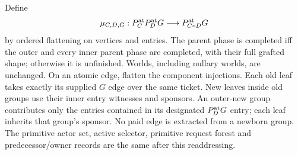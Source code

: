 \documentclass[11pt]{article}
\begin{document}
Define
\[
 \mu_{C,D,G}:P_C^{\rm at}P_D^{\rm at}G
             \longrightarrow P_{C\circ D}^{\rm at}G
\]
by ordered flattening on vertices and entries. The parent phase is completed iff the outer and every inner parent phase are completed, with their full grafted shape; otherwise it is unfinished. Worlds, including nullary worlds, are unchanged. On an atomic edge, flatten the component injections. Each old leaf takes exactly its supplied $G$ edge over the same ticket. New leaves inside old groups use their inner entry witnesses and sponsors. An outer-new group contributes only the entries contained in its designated $P_D^{\rm at}G$ entry; each leaf inherits that group's sponsor. No paid edge is extracted from a newborn group. The primitive actor set, active selector, primitive request forest and predecessor/owner records are the same after this readdressing.
\end{document}
